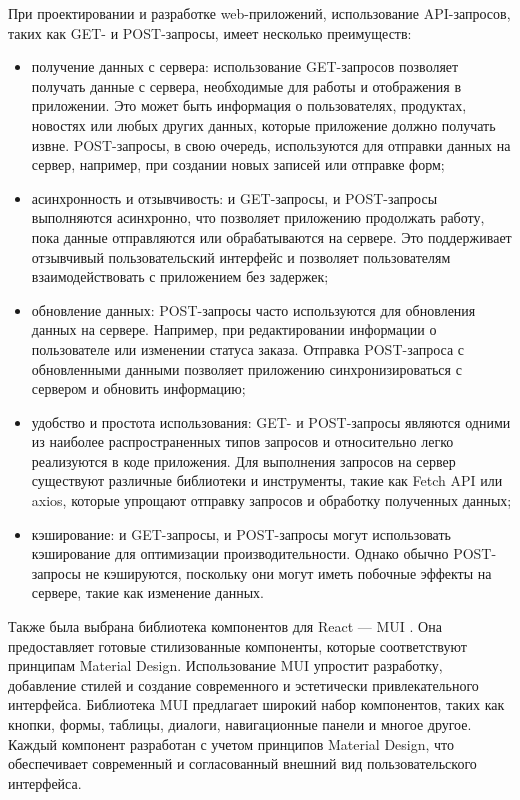 При проектировании и разработке web-приложений, использование API-запросов, таких как GET- и POST-запросы, имеет несколько преимуществ:
\begin{itemize}
    \item получение данных с сервера: использование GET-запросов позволяет получать данные с сервера, необходимые для работы и отображения в приложении. Это может быть информация о пользователях, продуктах, новостях или любых других данных, которые приложение должно получать извне. POST-запросы, в свою очередь, используются для отправки данных на сервер, например, при создании новых записей или отправке форм;
    \item асинхронность и отзывчивость: и GET-запросы, и POST-запросы выполняются асинхронно, что позволяет приложению продолжать работу, пока данные отправляются или обрабатываются на сервере. Это поддерживает отзывчивый пользовательский интерфейс и позволяет пользователям взаимодействовать с приложением без задержек;
    \item обновление данных: POST-запросы часто используются для обновления данных на сервере. Например, при редактировании информации о пользователе или изменении статуса заказа. Отправка POST-запроса с обновленными данными позволяет приложению синхронизироваться с сервером и обновить информацию;
    \item удобство и простота использования: GET- и POST-запросы являются одними из наиболее распространенных типов запросов и относительно легко реализуются в коде приложения. Для выполнения запросов на сервер существуют различные библиотеки и инструменты, такие как Fetch API или axios, которые упрощают отправку запросов и обработку полученных данных;
    \item кэширование: и GET-запросы, и POST-запросы могут использовать кэширование для оптимизации производительности. Однако обычно POST-запросы не кэшируются, поскольку они могут иметь побочные эффекты на сервере, такие как изменение данных.
\end{itemize}

Также была выбрана библиотека компонентов для React — MUI \cite{MUI}. Она предоставляет готовые стилизованные компоненты, которые соответствуют принципам Material Design. Использование MUI упростит разработку, добавление стилей и создание современного и эстетически привлекательного интерфейса.  Библиотека MUI предлагает широкий набор компонентов, таких как кнопки, формы, таблицы, диалоги, навигационные панели и многое другое. Каждый компонент разработан с учетом принципов Material Design, что обеспечивает современный и согласованный внешний вид пользовательского интерфейса.

